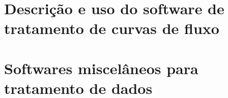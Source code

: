 \begin{apendicesenv}
	\section{Descrição e uso do software de tratamento de curvas de fluxo}
	\section{Softwares miscelâneos para tratamento de dados}
\end{apendicesenv}

%
%
%
%
%
%
%
